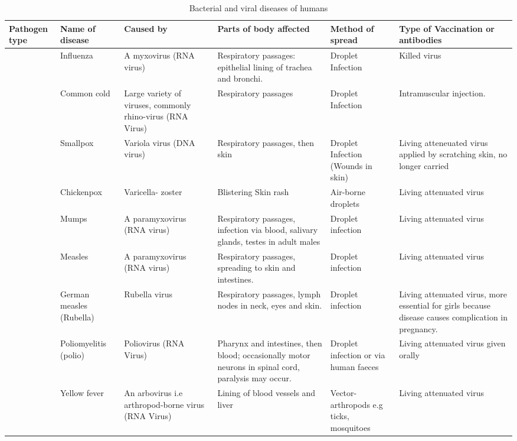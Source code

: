 \documentclass[
  openany]{book}
\begin{document}
\begin{table}

\caption{\label{tab:human-diseases}Bacterial and viral diseases of humans}
\centering
\begin{tabular}[t]{>{\raggedright\arraybackslash}p{5em}>{\raggedright\arraybackslash}p{6em}>{\raggedright\arraybackslash}p{6em}>{\raggedright\arraybackslash}p{8em}>{\raggedright\arraybackslash}p{8em}>{\raggedright\arraybackslash}p{6em}}
\toprule
Pathogen type & Name of disease & Caused by & Parts of body affected & Method of spread & Type of Vaccination or antibodies\\
\midrule
\rowcolor{gray!6}   & Influenza & A myxovirus (RNA virus) & Respiratory passages: epithelial lining of trachea and bronchi. & Droplet Infection & Killed virus\\
\cmidrule{2-6}
 & Common cold & Large variety of viruses, commonly rhino-virus (RNA Virus) & Respiratory passages & Droplet Infection & Intramuscular injection.\\
\cmidrule{2-6}
\rowcolor{gray!6}   & Smallpox & Variola virus (DNA virus) & Respiratory passages, then skin & Droplet Infection (Wounds in skin) & Living atteneuated virus applied by scratching skin, no longer carried\\
\cmidrule{2-6}
 & Chickenpox & Varicella- zoster & Blistering Skin rash & Air-borne droplets & Living attenuated virus\\
\cmidrule{2-6}
\rowcolor{gray!6}   & Mumps & A paramyxovirus (RNA virus) & Respiratory passages, infection via blood, salivary glands, testes in adult males & Droplet infection & Living attenuated virus\\
\cmidrule{2-6}
 & Measles & A paramyxovirus (RNA virus) & Respiratory passages, spreading to skin and intestines. & Droplet infection & Living attenuated virus\\
\cmidrule{2-6}
\rowcolor{gray!6}   & German measles (Rubella) & Rubella virus & Respiratory passages, lymph nodes in neck, eyes and skin. & Droplet infection & Living attenuated virus, more essential for girls because disease causes complication in pregnancy.\\
\cmidrule{2-6}
 & Poliomyelitis (polio) & Poliovirus (RNA Virus) & Pharynx and intestines, then blood; occasionally motor neurons in spinal cord, paralysis may occur. & Droplet infection or via human faeces & Living attenuated virus given orally\\
\cmidrule{2-6}
\rowcolor{gray!6}   & Yellow fever & An arbovirus i.e arthropod-borne virus (RNA Virus) & Lining of blood vessels and liver & Vector- arthropods e.g ticks, mosquitoes & Living attenuated virus\\

\end{tabular}
\end{table}
\end{document}
